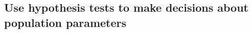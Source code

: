 \documentclass[slidestop,compress,mathserif,12pt,t,professionalfonts,xcolor=table]{beamer}
\begin{document}













\subsection{Use hypothesis tests to make decisions about population parameters}
\label{mi4}

\end{document}
